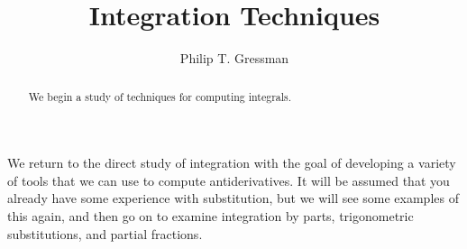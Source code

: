 \documentclass{ximera}
\title{Integration Techniques}
\author{Philip T. Gressman}
\begin{document}
\begin{abstract}
We begin a study of techniques for computing integrals.
\end{abstract}
\maketitle

We return to the direct study of integration with the goal of developing a variety of tools that we can use to compute antiderivatives. It will be assumed that you already have some experience with substitution, but we will see some examples of this again, and then go on to examine integration by parts, trigonometric substitutions, and partial fractions.
\end{document}

